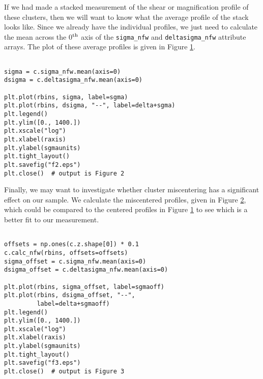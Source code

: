 \documentclass[twocolumn]{aastex6}
\newcommand{\code}{\lstinline[style=codeintext]}
\begin{document}
If we had made a stacked measurement of the shear or magnification profile of these clusters, then we will want to know what the average profile of the stack looks like. Since we already have the individual profiles, we just need to calculate the mean across the 0$^{\rm th}$ axis of the \code{sigma_nfw} and \code{deltasigma_nfw} attribute arrays. The plot of these average profiles is given in Figure \ref{f2}.

\begin{lstlisting}

sigma = c.sigma_nfw.mean(axis=0)
dsigma = c.deltasigma_nfw.mean(axis=0)

plt.plot(rbins, sigma, label=sgma)
plt.plot(rbins, dsigma, "--", label=delta+sgma)
plt.legend()
plt.ylim([0., 1400.])
plt.xscale("log")
plt.xlabel(raxis)
plt.ylabel(sgmaunits)
plt.tight_layout()
plt.savefig("f2.eps")
plt.close()  # output is Figure 2

\end{lstlisting}

\begin{figure}\label{f2}
\end{figure}

Finally, we may want to investigate whether cluster miscentering has a significant effect on our sample. We calculate the miscentered profiles, given in Figure \ref{f3}, which could be compared to the centered profiles in Figure \ref{f2} to see which is a better fit to our measurement.

\begin{lstlisting}

offsets = np.ones(c.z.shape[0]) * 0.1
c.calc_nfw(rbins, offsets=offsets)
sigma_offset = c.sigma_nfw.mean(axis=0)
dsigma_offset = c.deltasigma_nfw.mean(axis=0)

plt.plot(rbins, sigma_offset, label=sgmaoff)
plt.plot(rbins, dsigma_offset, "--", 
         label=delta+sgmaoff)
plt.legend()
plt.ylim([0., 1400.])
plt.xscale("log")
plt.xlabel(raxis)
plt.ylabel(sgmaunits)
plt.tight_layout()
plt.savefig("f3.eps")
plt.close()  # output is Figure 3

\end{lstlisting}
\begin{figure}\label{f3}
\end{figure}
\end{document}

